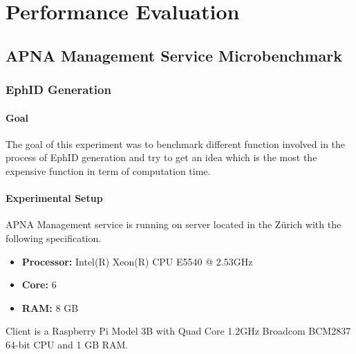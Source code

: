 
\chapter{Performance Evaluation} %
\label{performance} %

\section{APNA Management Service Microbenchmark}
\subsection{EphID Generation}
\subsubsection{Goal}
The goal of this experiment was to benchmark different function involved in the process of EphID generation and try to get an idea which is the most the expensive function in term of computation time.
\subsubsection{Experimental Setup}
APNA Management service is running on server located in the Z\"urich with the following specification.
\begin{itemize}
    \item \textbf{Processor:} Intel(R) Xeon(R) CPU E5540  @ 2.53GHz
    \item \textbf{Core:} 6
    \item \textbf{RAM:} 8 GB
\end{itemize}
Client is a Raspberry Pi Model 3B with Quad Core 1.2GHz Broadcom BCM2837 64-bit CPU and 1 GB RAM.
